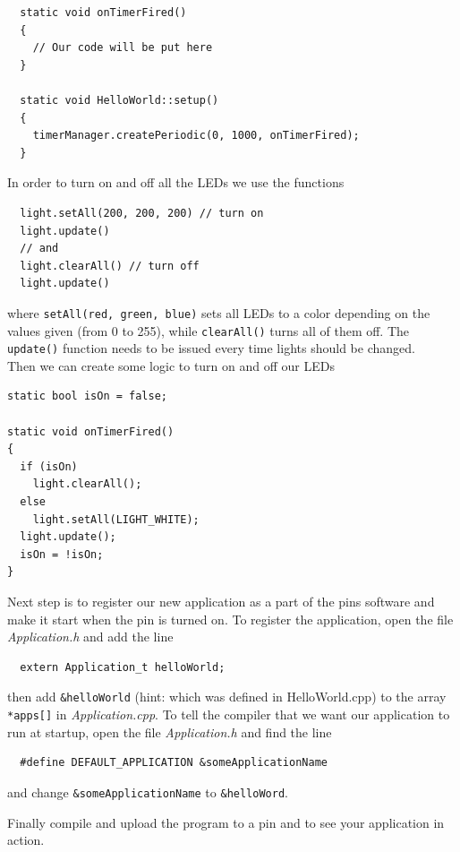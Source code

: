\documentclass[a4paper, twoside, final]{book}%
\begin{document}
\begin{lstlisting}
  static void onTimerFired()
  {
    // Our code will be put here
  }
  
  static void HelloWorld::setup()
  {
    timerManager.createPeriodic(0, 1000, onTimerFired);
  }
\end{lstlisting}

In order to turn on and off all the LEDs we use the functions 

\begin{lstlisting}
  light.setAll(200, 200, 200) // turn on
  light.update()
  // and 
  light.clearAll() // turn off
  light.update()
\end{lstlisting}

where \texttt{setAll(red, green, blue)} sets all LEDs to a color depending on the values given (from 0 to 255), while \texttt{clearAll()} turns all of them off. The \texttt{update()} function needs to be issued every time lights should be changed.
\\
Then we can create some logic to turn on and off our LEDs

\begin{lstlisting}
static bool isOn = false;

static void onTimerFired()
{
  if (isOn)
    light.clearAll();
  else
    light.setAll(LIGHT_WHITE);
  light.update();
  isOn = !isOn;
}
\end{lstlisting}

Next step is to register our new application as a part of the pins software and make it start when the pin is turned on.
To register the application, open the file \emph{Application.h} and add the line 

\begin{lstlisting}
  extern Application_t helloWorld;
\end{lstlisting}

then add \texttt{\&helloWorld} (hint: which was defined in HelloWorld.cpp) to the array \texttt{*apps[]} in \emph{Application.cpp}.
To tell the compiler that we want our application to run at startup, open the file \emph{Application.h} and find the line

\begin{lstlisting}
  #define DEFAULT_APPLICATION &someApplicationName
\end{lstlisting}

and change \texttt{\&someApplicationName} to \texttt{\&helloWord}. 

Finally compile and upload the program to a pin and to see your application in action.
\end{document}

